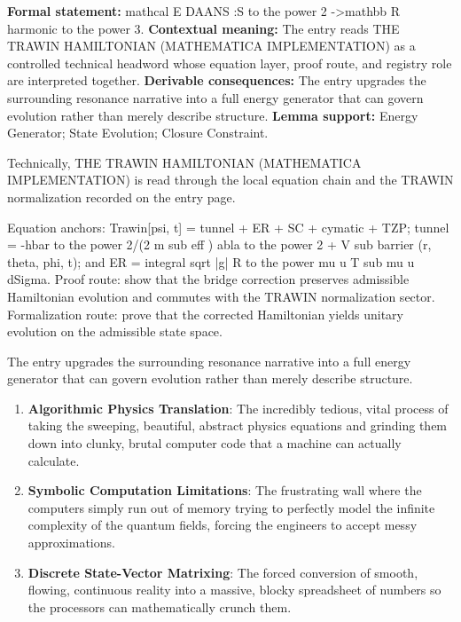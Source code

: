 \begingroup\footnotesize\setlength{\emergencystretch}{3em}\sloppy
\textbf{Formal statement:} mathcal E DAANS :S to the power 2 ->mathbb R harmonic to the power 3. \textbf{Contextual meaning:} The entry reads THE TRAWIN HAMILTONIAN (MATHEMATICA IMPLEMENTATION) as a controlled technical headword whose equation layer, proof route, and registry role are interpreted together. \textbf{Derivable consequences:} The entry upgrades the surrounding resonance narrative into a full energy generator that can govern evolution rather than merely describe structure. \textbf{Lemma support:} Energy Generator; State Evolution; Closure Constraint.\par
\endgroup

Technically, THE TRAWIN HAMILTONIAN (MATHEMATICA IMPLEMENTATION) is read through the local equation chain and the TRAWIN normalization recorded on the entry page.

Equation anchors:  Trawin[psi, t] =  tunnel +  ER +  SC +  cymatic +  TZP;  tunnel = -hbar to the power 2/(2 m sub eff ) abla to the power 2 + V sub barrier (r, theta, phi, t); and  ER = integral sqrt |g| R to the power mu u T sub mu u dSigma. Proof route: show that the bridge correction preserves admissible Hamiltonian evolution and commutes with the TRAWIN normalization sector. Formalization route: prove that the corrected Hamiltonian yields unitary evolution on the admissible state space.

The entry upgrades the surrounding resonance narrative into a full energy generator that can govern evolution rather than merely describe structure.
\endgroup

\begin{enumerate}[leftmargin=1.6em,itemsep=6pt,topsep=4pt]
\item \textbf{Algorithmic Physics Translation}: The incredibly tedious, vital process of taking the sweeping, beautiful, abstract physics equations and grinding them down into clunky, brutal computer code that a machine can actually calculate.
\item \textbf{Symbolic Computation Limitations}: The frustrating wall where the computers simply run out of memory trying to perfectly model the infinite complexity of the quantum fields, forcing the engineers to accept messy approximations.
\item \textbf{Discrete State-Vector Matrixing}: The forced conversion of smooth, flowing, continuous reality into a massive, blocky spreadsheet of numbers so the processors can mathematically crunch them.
\end{enumerate}

